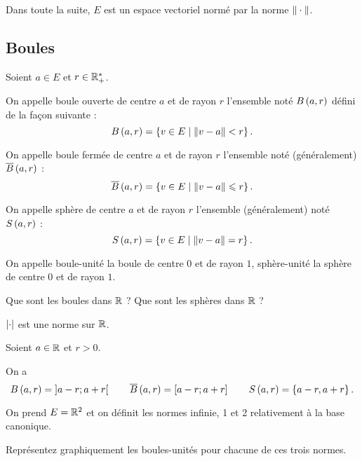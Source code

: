 Dans toute la suite, \(E\) est un espace vectoriel normé par la norme \(\norme{}\).

\subsection{Boules}

\begin{defi}
Soient \(a\in E\) et \(r\in\mathbb{R}_+^*\).

On appelle boule ouverte de centre \(a\) et de rayon \(r\) l'ensemble noté \(\bouleo{a}{r}\) défini de la façon suivante : \[\bouleo{a}{r}=\accol{v\in E\tq\norme{v-a}<r}.\]

On appelle boule fermée de centre \(a\) et de rayon \(r\) l'ensemble noté (généralement) \(\boulef{a}{r}\) : \[\boulef{a}{r}=\accol{v\in E\tq\norme{v-a}\leq r}.\]

On appelle sphère de centre \(a\) et de rayon \(r\) l'ensemble (généralement) noté \(\sphere{a}{r}\) : \[\sphere{a}{r}=\accol{v\in E\tq\norme{v-a}=r}.\]
\end{defi}

On appelle boule-unité la boule de centre \(0\) et de rayon \(1\), sphère-unité la sphère de centre \(0\) et de rayon \(1\).

\begin{exo}
Que sont les boules dans \(\mathbb{R}\) ? Que sont les sphères dans \(\mathbb{R}\) ?
\end{exo}

\begin{corr}
\(\left\lvert\cdot\right\rvert\) est une norme sur \(\mathbb{R}\).

Soient \(a\in\mathbb{R}\) et \(r>0\).

On a \[\bouleo{a}{r}=\intervee{a-r}{a+r}\qquad\boulef{a}{r}=\intervii{a-r}{a+r}\qquad\sphere{a}{r}=\accol{a-r,a+r}.\]
\end{corr}

\begin{exo}
On prend \(E=\mathbb{R}^2\) et on définit les normes infinie, 1 et 2 relativement à la base canonique.

Représentez graphiquement les boules-unités pour chacune de ces trois normes.
\end{exo}

